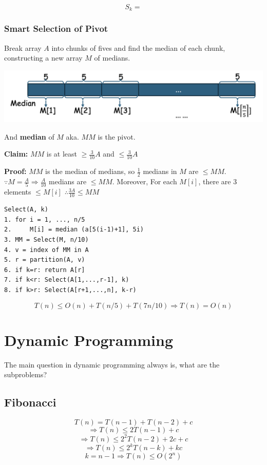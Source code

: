 \documentclass[12pt,a4paper]{article}
\begin{document}
\[S_k = \]

\subsubsection*{Smart Selection of Pivot}

Break array $A$ into chunks of fives and find the median of each chunk,
constructing a new array $M$ of medians.

\includegraphics[width=\textwidth]{./images/chunks_of_fives.png}

And \textbf{median} of $M$ aka. $MM$ is the pivot.

\textbf{Claim:} $MM$ is at least $\geq \frac{3}{10}A$ and $\leq \frac{3}{10}A$

\textbf{Proof:} $MM$ is the median of medians, so $\frac{1}{2}$ medians in $M$ are $\leq MM$.
$\because M = \frac{A}{5} \Rightarrow \frac{A}{10}$ medians are $\leq MM$. Moreover, 
For each $M[i]$, there are 3 elements $\leq M[i]$ $\therefore \frac{3A}{10} \leq MM$

\begin{verbatim}
Select(A, k)
1. for i = 1, ..., n/5
2.     M[i] = median (a[5(i-1)+1], 5i)
3. MM = Select(M, n/10)
4. v = index of MM in A
5. r = partition(A, v)
6. if k=r: return A[r]
7. if k<r: Select(A[1,...,r-1], k)
8. if k>r: Select(A[r+1,...,n], k-r)
\end{verbatim}

\[T(n) \leq O(n) + T(n/5) + T(7n/10) \Rightarrow T(n) = O(n)\]

\section*{Dynamic Programming}

The main question in dynamic programming always is, what are the subproblems?

\subsection*{Fibonacci}

\[T(n) = T(n-1) + T(n-2) + c\]
\[\Rightarrow T(n) \leq 2T(n-1) + c\]
\[\Rightarrow T(n) \leq 2^2T(n-2) + 2c + c\]
\[\Rightarrow T(n) \leq 2^kT(n-k) + kc\]
\[k = n - 1 \Rightarrow T(n) \leq O(2^n)\]
\end{document}
